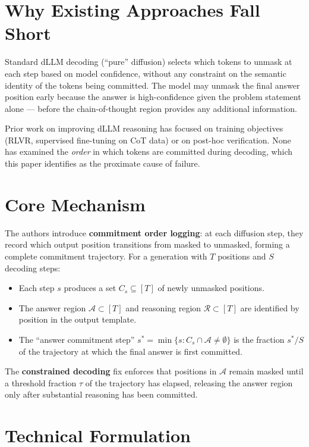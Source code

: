 \documentclass[10pt,twocolumn]{article}
\begin{document}
\section{Why Existing Approaches Fall Short}

Standard dLLM decoding (``pure'' diffusion) selects which tokens to unmask at each
step based on model confidence, without any constraint on the semantic identity of
the tokens being committed. The model may unmask the final answer position early
because the answer is high-confidence given the problem statement alone — before
the chain-of-thought region provides any additional information.

Prior work on improving dLLM reasoning has focused on training objectives (RLVR,
supervised fine-tuning on CoT data) or on post-hoc verification. None has examined
the \emph{order} in which tokens are committed during decoding, which this paper
identifies as the proximate cause of failure.

\section{Core Mechanism}

The authors introduce \textbf{commitment order logging}: at each diffusion step, they
record which output position transitions from masked to unmasked, forming a complete
commitment trajectory. For a generation with $T$ positions and $S$ decoding steps:

\begin{itemize}[itemsep=2pt,parsep=0pt]
  \item Each step $s$ produces a set $C_s \subseteq [T]$ of newly unmasked positions.
  \item The answer region $\mathcal{A} \subset [T]$ and reasoning region $\mathcal{R} \subset [T]$
    are identified by position in the output template.
  \item The ``answer commitment step'' $s^* = \min\{s : C_s \cap \mathcal{A} \neq \emptyset\}$
    is the fraction $s^*/S$ of the trajectory at which the final answer is first committed.
\end{itemize}

The \textbf{constrained decoding} fix enforces that positions in $\mathcal{A}$ remain
masked until a threshold fraction $\tau$ of the trajectory has elapsed, releasing the
answer region only after substantial reasoning has been committed.

\section{Technical Formulation}
\end{document}
